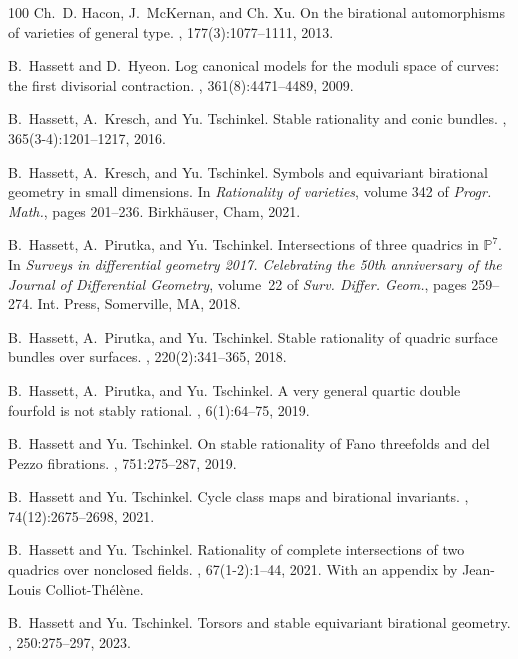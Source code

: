 \documentclass[12pt,reqno]{amsart}
\theoremstyle{plain}
\theoremstyle{remark}
\theoremstyle{definition}
\numberwithin{equation}{section}
\begin{document}
\begin{thebibliography}{100}
Ch.~D. Hacon, J.~McKernan, and Ch. Xu.
\newblock On the birational automorphisms of varieties of general type.
, 177(3):1077--1111, 2013.

B.~Hassett and D.~Hyeon.
\newblock Log canonical models for the moduli space of curves: the first
  divisorial contraction.
, 361(8):4471--4489, 2009.

B.~Hassett, A.~Kresch, and Yu. Tschinkel.
\newblock Stable rationality and conic bundles.
, 365(3-4):1201--1217, 2016.

B.~Hassett, A.~Kresch, and Yu. Tschinkel.
\newblock Symbols and equivariant birational geometry in small dimensions.
\newblock In {\em Rationality of varieties}, volume 342 of {\em Progr. Math.},
  pages 201--236. Birkh\"{a}user, Cham, 2021.

B.~Hassett, A.~Pirutka, and Yu. Tschinkel.
\newblock Intersections of three quadrics in {$\mathbb P^7$}.
\newblock In {\em Surveys in differential geometry 2017. {C}elebrating the 50th
  anniversary of the {J}ournal of {D}ifferential {G}eometry}, volume~22 of {\em
  Surv. Differ. Geom.}, pages 259--274. Int. Press, Somerville, MA, 2018.

B.~Hassett, A.~Pirutka, and Yu. Tschinkel.
\newblock Stable rationality of quadric surface bundles over surfaces.
, 220(2):341--365, 2018.

B.~Hassett, A.~Pirutka, and Yu. Tschinkel.
\newblock A very general quartic double fourfold is not stably rational.
, 6(1):64--75, 2019.

B.~Hassett and Yu. Tschinkel.
\newblock On stable rationality of {F}ano threefolds and del {P}ezzo
  fibrations.
, 751:275--287, 2019.

B.~Hassett and Yu. Tschinkel.
\newblock Cycle class maps and birational invariants.
, 74(12):2675--2698, 2021.

B.~Hassett and Yu. Tschinkel.
\newblock Rationality of complete intersections of two quadrics over nonclosed
  fields.
, 67(1-2):1--44, 2021.
\newblock With an appendix by Jean-Louis Colliot-Th\'{e}l\`ene.

B.~Hassett and Yu. Tschinkel.
\newblock Torsors and stable equivariant birational geometry.
, 250:275--297, 2023.


\end{thebibliography}
\end{document}
